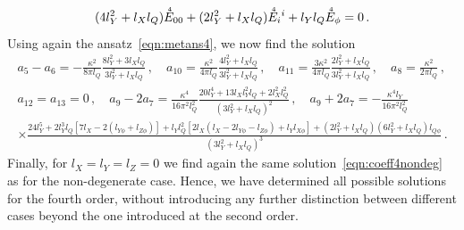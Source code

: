\documentclass[notitlepage,a4paper,aps,prd,onecolumn,superscriptaddress,nofootinbib,groupedaddress,longbibliography]{revtex4-2}
\newcommand{\order}[2]{\accentset{#2}{#1}}
\begin{document}
\begin{equation}
(4l_Y^2 + l_Xl_Q)\order{E}{4}_{00} + (2l_Y^2 + l_Xl_Q)\order{E}{4}_i{}^i + l_Yl_Q\order{E}{4}_{\phi} = 0\,.
\end{equation}
Using again the ansatz~\eqref{eqn:metans4}, we now find the solution
\begin{gather}
a_5 - a_6 = -\frac{\kappa^2}{8\pi l_Q}\frac{8l_Y^2 + 3l_Xl_Q}{3l_Y^2 + l_Xl_Q}\,, \quad
a_{10} = \frac{\kappa^2}{4\pi l_Q}\frac{4l_Y^2 + l_Xl_Q}{3l_Y^2 + l_Xl_Q}\,, \quad
a_{11} = \frac{3\kappa^2}{4\pi l_Q}\frac{2l_Y^2 + l_Xl_Q}{3l_Y^2 + l_Xl_Q}\,, \quad
a_8 = \frac{\kappa^2}{2\pi l_Q}\,,\nonumber\\
a_{12} = a_{13} = 0\,, \quad
a_9 - 2a_7 = \frac{\kappa^4}{16\pi^2l_Q^2}\frac{20l_Y^4 + 13l_Xl_Y^2l_Q + 2l_X^2l_Q^2}{(3l_Y^2 + l_Xl_Q)^2}\,, \quad
a_9 + 2a_7 = -\frac{\kappa^4l_Y}{16\pi^2l_Q^2}\label{eqn:coeff4deg}\\
\times\frac{24l_Y^5 + 2l_Y^3l_Q[7l_X - 2(l_{Y\phi} + l_{Z\phi})] + l_Yl_Q^2[2l_X(l_X - 2l_{Y\phi} - l_{Z\phi}) + l_Yl_{X\phi}] + (2l_Y^2 + l_Xl_Q)(6l_Y^2 + l_Xl_Q)l_{Q\phi}}{(3l_Y^2 + l_Xl_Q)^3}\,.\nonumber
\end{gather}
Finally, for \(l_X = l_Y = l_Z = 0\) we find again the same solution~\eqref{eqn:coeff4nondeg} as for the non-degenerate case. Hence, we have determined all possible solutions for the fourth order, without introducing any further distinction between different cases beyond the one introduced at the second order.
\end{document}
